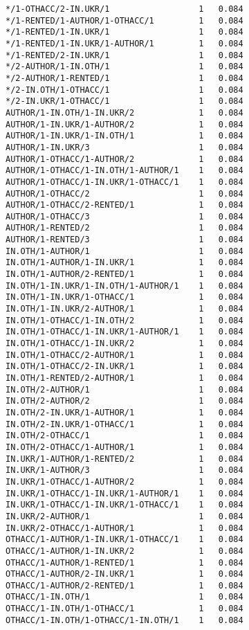 \documentclass[
  letterpaper,
  DIV=11,
  numbers=noendperiod]{scrreprt}
\begin{document}
\begin{verbatim}
*/1-OTHACC/2-IN.UKR/1                  1   0.084
*/1-RENTED/1-AUTHOR/1-OTHACC/1         1   0.084
*/1-RENTED/1-IN.UKR/1                  1   0.084
*/1-RENTED/1-IN.UKR/1-AUTHOR/1         1   0.084
*/1-RENTED/2-IN.UKR/1                  1   0.084
*/2-AUTHOR/1-IN.OTH/1                  1   0.084
*/2-AUTHOR/1-RENTED/1                  1   0.084
*/2-IN.OTH/1-OTHACC/1                  1   0.084
*/2-IN.UKR/1-OTHACC/1                  1   0.084
AUTHOR/1-IN.OTH/1-IN.UKR/2             1   0.084
AUTHOR/1-IN.UKR/1-AUTHOR/2             1   0.084
AUTHOR/1-IN.UKR/1-IN.OTH/1             1   0.084
AUTHOR/1-IN.UKR/3                      1   0.084
AUTHOR/1-OTHACC/1-AUTHOR/2             1   0.084
AUTHOR/1-OTHACC/1-IN.OTH/1-AUTHOR/1    1   0.084
AUTHOR/1-OTHACC/1-IN.UKR/1-OTHACC/1    1   0.084
AUTHOR/1-OTHACC/2                      1   0.084
AUTHOR/1-OTHACC/2-RENTED/1             1   0.084
AUTHOR/1-OTHACC/3                      1   0.084
AUTHOR/1-RENTED/2                      1   0.084
AUTHOR/1-RENTED/3                      1   0.084
IN.OTH/1-AUTHOR/1                      1   0.084
IN.OTH/1-AUTHOR/1-IN.UKR/1             1   0.084
IN.OTH/1-AUTHOR/2-RENTED/1             1   0.084
IN.OTH/1-IN.UKR/1-IN.OTH/1-AUTHOR/1    1   0.084
IN.OTH/1-IN.UKR/1-OTHACC/1             1   0.084
IN.OTH/1-IN.UKR/2-AUTHOR/1             1   0.084
IN.OTH/1-OTHACC/1-IN.OTH/2             1   0.084
IN.OTH/1-OTHACC/1-IN.UKR/1-AUTHOR/1    1   0.084
IN.OTH/1-OTHACC/1-IN.UKR/2             1   0.084
IN.OTH/1-OTHACC/2-AUTHOR/1             1   0.084
IN.OTH/1-OTHACC/2-IN.UKR/1             1   0.084
IN.OTH/1-RENTED/2-AUTHOR/1             1   0.084
IN.OTH/2-AUTHOR/1                      1   0.084
IN.OTH/2-AUTHOR/2                      1   0.084
IN.OTH/2-IN.UKR/1-AUTHOR/1             1   0.084
IN.OTH/2-IN.UKR/1-OTHACC/1             1   0.084
IN.OTH/2-OTHACC/1                      1   0.084
IN.OTH/2-OTHACC/1-AUTHOR/1             1   0.084
IN.UKR/1-AUTHOR/1-RENTED/2             1   0.084
IN.UKR/1-AUTHOR/3                      1   0.084
IN.UKR/1-OTHACC/1-AUTHOR/2             1   0.084
IN.UKR/1-OTHACC/1-IN.UKR/1-AUTHOR/1    1   0.084
IN.UKR/1-OTHACC/1-IN.UKR/1-OTHACC/1    1   0.084
IN.UKR/2-AUTHOR/1                      1   0.084
IN.UKR/2-OTHACC/1-AUTHOR/1             1   0.084
OTHACC/1-AUTHOR/1-IN.UKR/1-OTHACC/1    1   0.084
OTHACC/1-AUTHOR/1-IN.UKR/2             1   0.084
OTHACC/1-AUTHOR/1-RENTED/1             1   0.084
OTHACC/1-AUTHOR/2-IN.UKR/1             1   0.084
OTHACC/1-AUTHOR/2-RENTED/1             1   0.084
OTHACC/1-IN.OTH/1                      1   0.084
OTHACC/1-IN.OTH/1-OTHACC/1             1   0.084
OTHACC/1-IN.OTH/1-OTHACC/1-IN.OTH/1    1   0.084

\end{verbatim}
\end{document}

